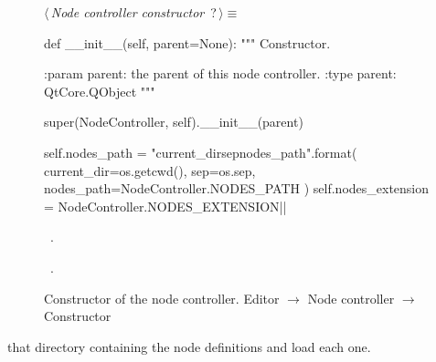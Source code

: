 \documentclass[%
    a4paper,    %
    justified,  %
    nobib,      %
    openany     %
]{tufte-book}
\begin{document}
\begin{figure}
\begin{flushleft} \small
\begin{minipage}{\linewidth}\label{scrap107}\raggedright\small
{} $\langle\,${\itshape Node controller constructor}\nobreak\ {\footnotesize {?}}$\,\rangle\equiv$
\vspace{-1ex}
\begin{pythoncode}
def __init__(self, parent=None):
    """ Constructor. 

    :param parent: the parent of this node controller.
    :type  parent: QtCore.QObject
    """

    super(NodeController, self).__init__(parent)

    self.nodes_path = "{current_dir}{sep}{nodes_path}".format(
        current_dir=os.getcwd(),
        sep=os.sep,
        nodes_path=NodeController.NODES_PATH
    )
    self.nodes_extension = NodeController.NODES_EXTENSION|\NWsep|
\end{pythoncode}
\vspace{1.5ex}
\footnotesize
\begin{list}{}{\setlength{\itemsep}{-\parsep}\setlength{\itemindent}{-\leftmargin}}
\item \NWtxtMacroDefBy\ .
\item \NWtxtMacroRefIn\ .

\item{}
\end{list}
\end{minipage}\vspace{4ex}
\end{flushleft}
\caption{Constructor of the node controller.
  \newline{}\newline{}Editor $\rightarrow$ Node controller $\rightarrow$
  Constructor}
\label{editor:lst:node-controller:constructor}
\end{figure}

 that directory containing the
node definitions and load each one.
\end{document}
